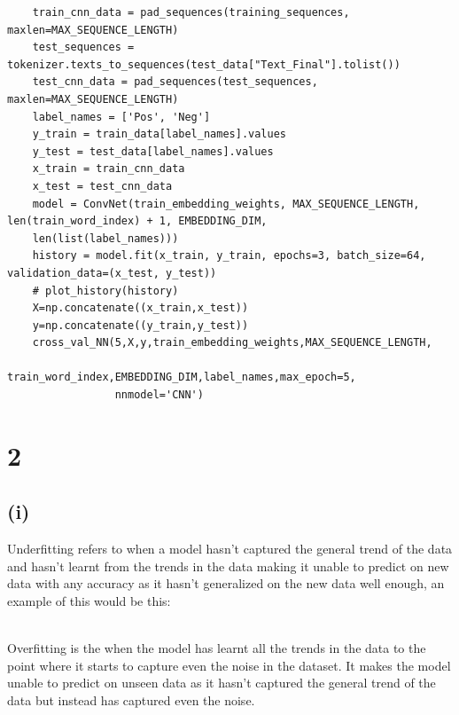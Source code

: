 \documentclass[11pt]{article} %
\begin{document}
\begin{verbatim}
    train_cnn_data = pad_sequences(training_sequences, maxlen=MAX_SEQUENCE_LENGTH)
    test_sequences = tokenizer.texts_to_sequences(test_data["Text_Final"].tolist())
    test_cnn_data = pad_sequences(test_sequences, maxlen=MAX_SEQUENCE_LENGTH)
    label_names = ['Pos', 'Neg']
    y_train = train_data[label_names].values
    y_test = test_data[label_names].values
    x_train = train_cnn_data
    x_test = test_cnn_data
    model = ConvNet(train_embedding_weights, MAX_SEQUENCE_LENGTH, len(train_word_index) + 1, EMBEDDING_DIM,
    len(list(label_names)))
    history = model.fit(x_train, y_train, epochs=3, batch_size=64, validation_data=(x_test, y_test))
    # plot_history(history)
    X=np.concatenate((x_train,x_test))
    y=np.concatenate((y_train,y_test))
    cross_val_NN(5,X,y,train_embedding_weights,MAX_SEQUENCE_LENGTH,
                 train_word_index,EMBEDDING_DIM,label_names,max_epoch=5,
                 nnmodel='CNN')
\end{verbatim}
\newpage
\section{2}
\subsection{(i)}
Underfitting refers to when a model hasn't captured the general trend of the data and hasn't learnt from the trends in the data making it unable to predict on new data with any accuracy as it hasn't generalized on the new data well enough,  an example of this would be this:
\begin{figure}[h]
\centering
{}
\qquad
\end{figure}
\\
Overfitting is the when the model has learnt all the trends in the data to the point where it starts to capture even the noise in the dataset.  It makes the model unable to predict on unseen data as it hasn't captured the general trend of the data but instead has captured even the noise. 
\begin{figure}[h]
\centering
{}
\qquad
\end{figure}
\end{document}
